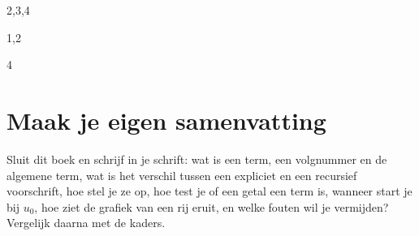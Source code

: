 \begin{oefeningen}
\begin{alleenvoor}{2,3,4}

\end{alleenvoor}
\begin{alleenvoor}{1,2}
\end{alleenvoor}

\begin{alleenvoor}{4}


\end{alleenvoor}
\end{oefeningen}


\begin{oefeningen}








\end{oefeningen}


\ifzelfstudie
\section*{Maak je eigen samenvatting}
Sluit dit boek en schrijf in je schrift: wat is een term, een volgnummer en de algemene term, wat is het verschil tussen een expliciet en een recursief voorschrift, hoe stel je ze op, hoe test je of een getal een term is, wanneer start je bij $u_0$, hoe ziet de grafiek van een rij eruit, en welke fouten wil je vermijden? Vergelijk daarna met de kaders.
\fi
